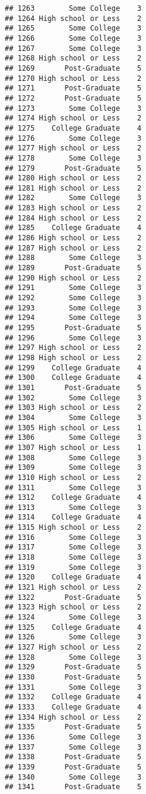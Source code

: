 \documentclass[
]{article}
\begin{document}
\begin{verbatim}
## 1263        Some College    3
## 1264 High school or Less    2
## 1265        Some College    3
## 1266        Some College    3
## 1267        Some College    3
## 1268 High school or Less    2
## 1269       Post-Graduate    5
## 1270 High school or Less    2
## 1271       Post-Graduate    5
## 1272       Post-Graduate    5
## 1273        Some College    3
## 1274 High school or Less    2
## 1275    College Graduate    4
## 1276        Some College    3
## 1277 High school or Less    2
## 1278        Some College    3
## 1279       Post-Graduate    5
## 1280 High school or Less    2
## 1281 High school or Less    2
## 1282        Some College    3
## 1283 High school or Less    2
## 1284 High school or Less    2
## 1285    College Graduate    4
## 1286 High school or Less    2
## 1287 High school or Less    2
## 1288        Some College    3
## 1289       Post-Graduate    5
## 1290 High school or Less    2
## 1291        Some College    3
## 1292        Some College    3
## 1293        Some College    3
## 1294        Some College    3
## 1295       Post-Graduate    5
## 1296        Some College    3
## 1297 High school or Less    2
## 1298 High school or Less    2
## 1299    College Graduate    4
## 1300    College Graduate    4
## 1301       Post-Graduate    5
## 1302        Some College    3
## 1303 High school or Less    2
## 1304        Some College    3
## 1305 High school or Less    1
## 1306        Some College    3
## 1307 High school or Less    1
## 1308        Some College    3
## 1309        Some College    3
## 1310 High school or Less    2
## 1311        Some College    3
## 1312    College Graduate    4
## 1313        Some College    3
## 1314    College Graduate    4
## 1315 High school or Less    2
## 1316        Some College    3
## 1317        Some College    3
## 1318        Some College    3
## 1319        Some College    3
## 1320    College Graduate    4
## 1321 High school or Less    2
## 1322       Post-Graduate    5
## 1323 High school or Less    2
## 1324        Some College    3
## 1325    College Graduate    4
## 1326        Some College    3
## 1327 High school or Less    2
## 1328        Some College    3
## 1329       Post-Graduate    5
## 1330       Post-Graduate    5
## 1331        Some College    3
## 1332    College Graduate    4
## 1333    College Graduate    4
## 1334 High school or Less    2
## 1335       Post-Graduate    5
## 1336        Some College    3
## 1337        Some College    3
## 1338       Post-Graduate    5
## 1339       Post-Graduate    5
## 1340        Some College    3
## 1341       Post-Graduate    5

\end{verbatim}
\end{document}
